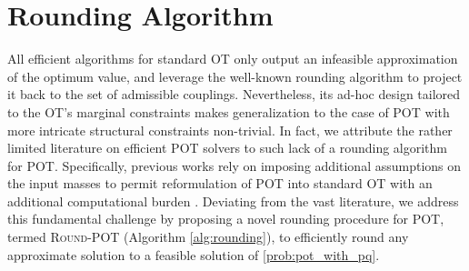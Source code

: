 \section{Rounding Algorithm}
All efficient algorithms for standard OT
\citep{Dvurechensky-2018-Computational, lin2019efficient, guminov2021accelerated}
only output an infeasible approximation of the optimum value, and leverage the well-known rounding algorithm \citep[Algorithm 2]{altschuler2017near} to project it back to the set of admissible couplings. Nevertheless, its ad-hoc design tailored to the OT's marginal constraints makes  generalization to the case of POT with more intricate structural constraints non-trivial. In fact, we attribute the rather limited literature on efficient POT solvers to such lack of a rounding algorithm for POT. Specifically, previous works rely on imposing additional assumptions on the input masses to permit reformulation of POT into standard OT with an additional computational burden \cite{Chapel-nips2020, nhatho-mmpot}. Deviating from the vast literature, we address this fundamental challenge by proposing a novel rounding procedure for POT, termed \textsc{Round-POT} (Algorithm \ref{alg:rounding}), to efficiently round any approximate solution to a feasible solution of \eqref{prob:pot_with_pq}.
